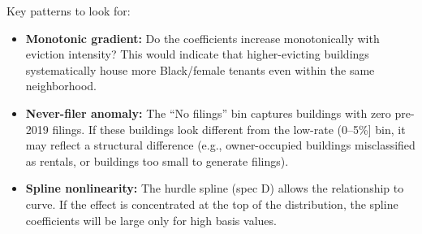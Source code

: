 \documentclass[
  11pt,
]{article}
\providecommand{\tightlist}{%
  \setlength{\itemsep}{0pt}\setlength{\parskip}{0pt}}
\begin{document}
Key patterns to look for:

\begin{itemize}
\tightlist
\item
  \textbf{Monotonic gradient:} Do the coefficients increase
  monotonically with eviction intensity? This would indicate that
  higher-evicting buildings systematically house more Black/female
  tenants even within the same neighborhood.
\item
  \textbf{Never-filer anomaly:} The ``No filings'' bin captures
  buildings with zero pre-2019 filings. If these buildings look
  different from the low-rate (0--5\%{]} bin, it may reflect a
  structural difference (e.g., owner-occupied buildings misclassified as
  rentals, or buildings too small to generate filings).
\item
  \textbf{Spline nonlinearity:} The hurdle spline (spec D) allows the
  relationship to curve. If the effect is concentrated at the top of the
  distribution, the spline coefficients will be large only for high
  basis values.
\end{itemize}
\end{document}
